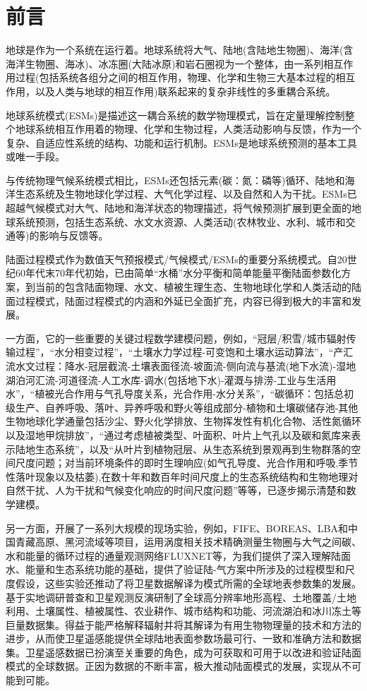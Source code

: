 \chapter*{前言}

地球是作为一个系统在运行着。地球系统将大气、陆地(含陆地生物圈)、海洋(含海洋生物圈、海冰)、冰冻圈(大陆冰原)和岩石圈视为一个整体，由一系列相互作用过程(包括系统各组分之间的相互作用，物理、化学和生物三大基本过程的相互作用，以及人类与地球的相互作用)联系起来的复杂非线性的多重耦合系统。

地球系统模式(ESMs)是描述这一耦合系统的数学物理模式，旨在定量理解控制整个地球系统相互作用着的物理、化学和生物过程，人类活动影响与反馈，作为一个复杂、自适应性系统的结构、功能和运行机制。ESMs是地球系统预测的基本工具或唯一手段。

与传统物理气候系统模式相比，ESMs还包括元素(碳：氮：磷等)循环、陆地和海洋生态系统及生物地球化学过程、大气化学过程、以及自然和人为干扰。ESMs已超越气候模式对大气、陆地和海洋状态的物理描述，将气候预测扩展到更全面的地球系统预测，包括生态系统、水文水资源、人类活动(农林牧业、水利、城市和交通等)的影响与反馈等。

陆面过程模式作为数值天气预报模式/气候模式/ESMs的重要分系统模式。自20世纪60年代末70年代初始，已由简单“水桶”水分平衡和简单能量平衡陆面参数化方案，到当前的包含陆面物理、水文、植被生理生态、生物地球化学和人类活动的陆面过程模式，陆面过程模式的内涵和外延已全面扩充，内容已得到极大的丰富和发展。

一方面，它的一些重要的关键过程数学建模问题，例如，“冠层/积雪/城市辐射传输过程”，“水分相变过程”，“土壤水力学过程-可变饱和土壤水运动算法”，“产汇流水文过程：降水-冠层截流-土壤表面径流-坡面流-侧向流与基流(地下水流)-湿地湖泊河汇流-河道径流-人工水库-调水(包括地下水)-灌溉与排涝-工业与生活用水”，“植被光合作用与气孔导度关系，光合作用-水分关系”，“碳循环：包括总初级生产、自养呼吸、落叶、异养呼吸和野火等组成部分-植物和土壤碳储存池-其他生物地球化学通量包括沙尘、野火化学排放、生物挥发性有机化合物、活性氮循环以及湿地甲烷排放”，“通过考虑植被类型、叶面积、叶片上气孔以及碳和氮库来表示陆地生态系统”，以及“从叶片到植物冠层、从生态系统到景观再到生物群落的空间尺度问题；对当前环境条件的即时生理响应(如气孔导度、光合作用和呼吸,季节性落叶现象以及枯萎),在数十年和数百年时间尺度上的生态系统结构和生物地理对自然干扰、人为干扰和气候变化响应的时间尺度问题”等等，已逐步揭示清楚和数学建模。

另一方面，开展了一系列大规模的现场实验，例如，FIFE、BOREAS、LBA和中国青藏高原、黑河流域等项目，运用涡度相关技术精确测量生物圈与大气之间碳、水和能量的循环过程的通量观测网络FLUXNET等，为我们提供了深入理解陆面水、能量和生态系统功能的基础，提供了验证陆-气方案中所涉及的过程模型和尺度假设，这些实验还推动了将卫星数据解译为模式所需的全球地表参数集的发展。基于实地调研普查和卫星观测反演研制了全球高分辨率地形高程、土地覆盖/土地利用、土壤属性、植被属性、农业耕作、城市结构和功能、河流湖泊和冰川冻土等巨量数据集。得益于能严格解释辐射并将其解译为有用生物物理量的技术和方法的进步，从而使卫星遥感能提供全球陆地表面参数场最可行、一致和准确方法和数据集。卫星遥感数据已扮演至关重要的角色，成为可获取和可用于以改进和验证陆面模式的全球数据。正因为数据的不断丰富，极大推动陆面模式的发展，实现从不可能到可能。

